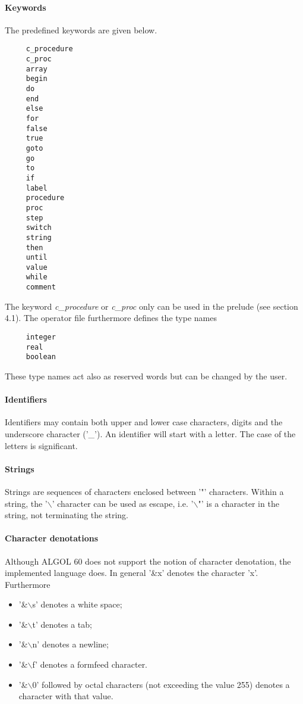 \documentclass[11pt]{article}
\begin{document}
\paragraph{Keywords}
The predefined keywords are given below.
{\footnotesize
\begin{verbatim}
     c_procedure
     c_proc
     array
     begin
     do
     end
     else
     for
     false
     true
     goto
     go
     to
     if
     label
     procedure
     proc
     step
     switch
     string
     then
     until
     value
     while
     comment
\end{verbatim}
}
The keyword {\em c\_procedure} or {\em c\_proc} only can be used in
the prelude (see section 4.1).
The operator file furthermore defines the type names
{\footnotesize
\begin{verbatim}
     integer
     real
     boolean
\end{verbatim}
}
These type names act also as reserved words but can be changed by the user.

\paragraph{Identifiers}
Identifiers may contain both upper and lower case characters, 
digits and the underscore character ('\_'). An identifier will start with a letter. The case of the letters is significant.

\paragraph{Strings}
Strings are sequences of characters enclosed between '"' characters.
Within a string, the '$\backslash$' character can be used as escape,
i.e. '$\backslash$"' 
is a character in the string, not terminating the string.

\paragraph{Character denotations}
Although ALGOL 60 does not support the notion of character denotation, the implemented language does. In general '\&x' denotes the character 'x'. Furthermore
\begin{itemize}
\item '\&$\backslash$s' denotes a white space;
\item '\&$\backslash$t' denotes a tab;
\item '\&$\backslash$n' denotes a newline;
\item '\&$\backslash$f' denotes a formfeed character.
\item '\&$\backslash$0' followed by octal characters (not exceeding the value 255) denotes a character with that value.
\end{itemize}
\end{document}
